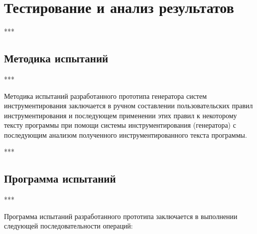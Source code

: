 \chapter{Тестирование и анализ результатов}

***

\section{Методика испытаний}

***

Методика испытаний разработанного прототипа генератора систем инструментирования заключается в ручном составлении пользовательских правил инструментирования и последующем применении этих правил к некоторому тексту программы при помощи системы инструментирования (генератора) с последующим анализом полученного инструментированного текста программы.

***

\section{Программа испытаний}

***

Программа испытаний разработанного прототипа заключается в выполнении следующей последовательности операций:

